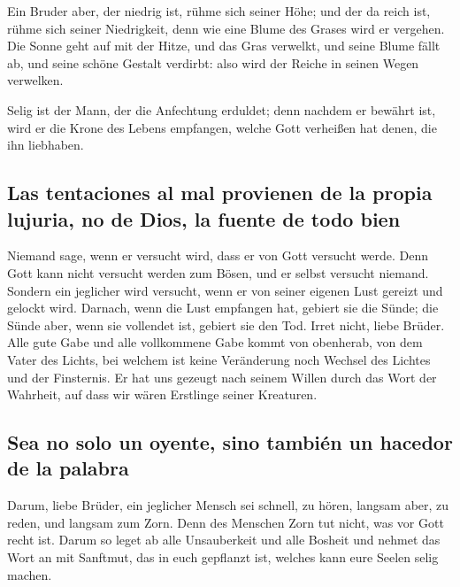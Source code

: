  Ein Bruder aber, der niedrig ist, rühme sich seiner Höhe;
 und der da reich ist, rühme sich seiner Niedrigkeit,
denn wie eine Blume des Grases wird er vergehen.  Die
Sonne geht auf mit der Hitze, und das Gras verwelkt, und seine Blume
fällt ab, und seine schöne Gestalt verdirbt: also wird der Reiche in
seinen Wegen verwelken.

 Selig ist der Mann, der die Anfechtung erduldet; denn
nachdem er bewährt ist, wird er die Krone des Lebens empfangen, welche
Gott verheißen hat denen, die ihn liebhaben.

\hypertarget{las-tentaciones-al-mal-provienen-de-la-propia-lujuria-no-de-dios-la-fuente-de-todo-bien}{%
\subsection{Las tentaciones al mal provienen de la propia lujuria, no de
Dios, la fuente de todo
bien}\label{las-tentaciones-al-mal-provienen-de-la-propia-lujuria-no-de-dios-la-fuente-de-todo-bien}}

 Niemand sage, wenn er versucht wird, dass er von Gott
versucht werde. Denn Gott kann nicht versucht werden zum Bösen, und er
selbst versucht niemand.  Sondern ein jeglicher wird
versucht, wenn er von seiner eigenen Lust gereizt und gelockt wird.
 Darnach, wenn die Lust empfangen hat, gebiert sie die
Sünde; die Sünde aber, wenn sie vollendet ist, gebiert sie den Tod.
 Irret nicht, liebe Brüder.  Alle gute
Gabe und alle vollkommene Gabe kommt von obenherab, von dem Vater des
Lichts, bei welchem ist keine Veränderung noch Wechsel des Lichtes und
der Finsternis.  Er hat uns gezeugt nach seinem Willen
durch das Wort der Wahrheit, auf dass wir wären Erstlinge seiner
Kreaturen.

\hypertarget{sea-no-solo-un-oyente-sino-tambiuxe9n-un-hacedor-de-la-palabra}{%
\subsection{Sea no solo un oyente, sino también un hacedor de la
palabra}\label{sea-no-solo-un-oyente-sino-tambiuxe9n-un-hacedor-de-la-palabra}}

 Darum, liebe Brüder, ein jeglicher Mensch sei schnell,
zu hören, langsam aber, zu reden, und langsam zum Zorn. 
Denn des Menschen Zorn tut nicht, was vor Gott recht ist.
 Darum so leget ab alle Unsauberkeit und alle Bosheit und
nehmet das Wort an mit Sanftmut, das in euch gepflanzt ist, welches kann
eure Seelen selig machen.

